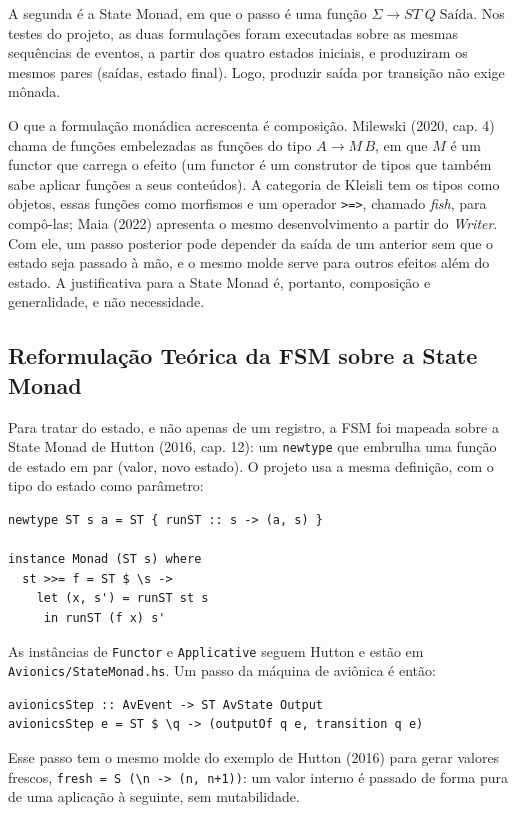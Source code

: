 \documentclass[12pt,a4paper]{article}
\begin{document}
A segunda é a State Monad, em que o passo é uma função $\Sigma \to ST\;Q\;\text{Saída}$. Nos testes do projeto, as duas formulações foram executadas sobre as mesmas sequências de eventos, a partir dos quatro estados iniciais, e produziram os mesmos pares (saídas, estado final). Logo, produzir saída por transição não exige mônada.

O que a formulação monádica acrescenta é composição. Milewski (2020, cap. 4) chama de funções embelezadas as funções do tipo $A \to M\,B$, em que $M$ é um functor que carrega o efeito (um functor é um construtor de tipos que também sabe aplicar funções a seus conteúdos). A categoria de Kleisli tem os tipos como objetos, essas funções como morfismos e um operador \texttt{>=>}, chamado \textit{fish}, para compô-las; Maia (2022) apresenta o mesmo desenvolvimento a partir do \textit{Writer}. Com ele, um passo posterior pode depender da saída de um anterior sem que o estado seja passado à mão, e o mesmo molde serve para outros efeitos além do estado. A justificativa para a State Monad é, portanto, composição e generalidade, e não necessidade.

\subsection{Reformulação Teórica da FSM sobre a State Monad}

Para tratar do estado, e não apenas de um registro, a FSM foi mapeada sobre a State Monad de Hutton (2016, cap. 12): um \texttt{newtype} que embrulha uma função de estado em par (valor, novo estado). O projeto usa a mesma definição, com o tipo do estado como parâmetro:

\begin{verbatim}
newtype ST s a = ST { runST :: s -> (a, s) }

instance Monad (ST s) where
  st >>= f = ST $ \s ->
    let (x, s') = runST st s
     in runST (f x) s'
\end{verbatim}

As instâncias de \texttt{Functor} e \texttt{Applicative} seguem Hutton e estão em \texttt{Avionics/StateMonad.hs}. Um passo da máquina de aviônica é então:

\begin{verbatim}
avionicsStep :: AvEvent -> ST AvState Output
avionicsStep e = ST $ \q -> (outputOf q e, transition q e)
\end{verbatim}

Esse passo tem o mesmo molde do exemplo de Hutton (2016) para gerar valores frescos, \texttt{fresh = S (\textbackslash n -> (n, n+1))}: um valor interno é passado de forma pura de uma aplicação à seguinte, sem mutabilidade.
\end{document}
